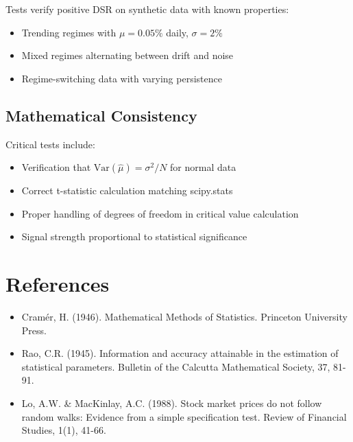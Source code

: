 \documentclass{article}
\begin{document}
Tests verify positive DSR on synthetic data with known properties:
\begin{itemize}
\item Trending regimes with $\mu = 0.05\% $ daily, $\sigma = 2\%$
\item Mixed regimes alternating between drift and noise
\item Regime-switching data with varying persistence
\end{itemize}

\subsection{Mathematical Consistency}

Critical tests include:
\begin{itemize}
\item Verification that $\text{Var}(\hat{\mu}) = \sigma^2/N$ for normal data
\item Correct t-statistic calculation matching scipy.stats
\item Proper handling of degrees of freedom in critical value calculation
\item Signal strength proportional to statistical significance
\end{itemize}

\section{References}

\begin{itemize}
\item Cramér, H. (1946). Mathematical Methods of Statistics. Princeton University Press.
\item Rao, C.R. (1945). Information and accuracy attainable in the estimation of statistical parameters. Bulletin of the Calcutta Mathematical Society, 37, 81-91.
\item Lo, A.W. \& MacKinlay, A.C. (1988). Stock market prices do not follow random walks: Evidence from a simple specification test. Review of Financial Studies, 1(1), 41-66.
\end{itemize}
\end{document}
